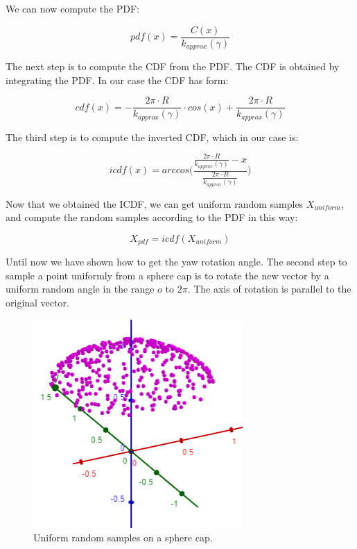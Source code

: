 \documentclass{PoliMi_MasterThesis}
\begin{document}
We can now compute the PDF:

$$pdf(x) = \frac{C(x)}{k_{approx}(\gamma)}$$

The next step is to compute the CDF from the PDF. The CDF is obtained by integrating the PDF. In our case the CDF has form:

$$cdf(x) = -\frac{2\pi \cdot R}{k_{approx}(\gamma)} \cdot cos(x) + \frac{2\pi \cdot R}{k_{approx}(\gamma)}$$

The third step is to compute the inverted CDF, which in our case is:

$$icdf(x) = arccos\Bigg(\frac{\frac{2\pi \cdot R}{k_{approx}(\gamma)}-x}{\frac{2\pi \cdot R}{k_{approx}(\gamma)}}\Bigg)$$

Now that we obtained the ICDF, we can get uniform random samples $X_{uniform}$, and compute the random samples according to the PDF in this way:

$$X_{pdf} = icdf(X_{uniform})$$

Until now we have shown how to get the yaw rotation angle. The second step to sample a point uniformly from a sphere cap is to rotate the new vector by a uniform random angle in the range $o$ to $2\pi$. The axis of rotation is parallel to the original vector.

\begin{figure}[H]
    \centering
    \includegraphics[width=\textwidth*\real{0.45}]{Images/sphere_cap_samples.png} 
    \caption{Uniform random samples on a sphere cap.}
    \label{fig:samples_sphere_cap}
\end{figure}
\end{document}
